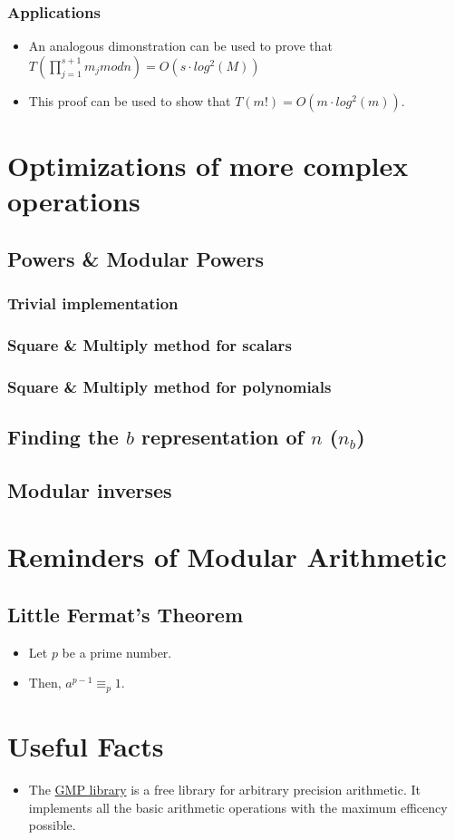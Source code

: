 \documentclass[12pt, a4paper, english]{report}
\begin{document}
\subsubsection{Applications}
\begin{itemize}
    \item An analogous dimonstration can be used to prove that $T(\prod_{j = 1}^{s+1} m_{j} mod n) = O(s \cdot log^{2}(M))$
    \item This proof can be used to show that $T(m!) = O(m \cdot log^{2}(m))$.
\end{itemize}

\section{Optimizations of more complex operations}
\subsection{Powers \& Modular Powers}
\subsubsection{Trivial implementation}
\subsubsection{Square \& Multiply method for scalars}
\subsubsection{Square \& Multiply method for polynomials}
\subsection{Finding the $b$ representation of $n$ ($n_{b}$)}
\subsection{Modular inverses}


\section{Reminders of Modular Arithmetic}
\subsection{Little Fermat's Theorem}
\begin{itemize}
    \item Let $p$ be a prime number.
    \item Then, $a^{p-1} \equiv_{p} 1$.
\end{itemize}



\section{Useful Facts}
\begin{itemize}
    \item The \href{https://gmplib.org/}{GMP library} is a free library for arbitrary precision arithmetic. It implements all the basic arithmetic operations with the maximum efficency possible.
\end{itemize}
\end{document}
